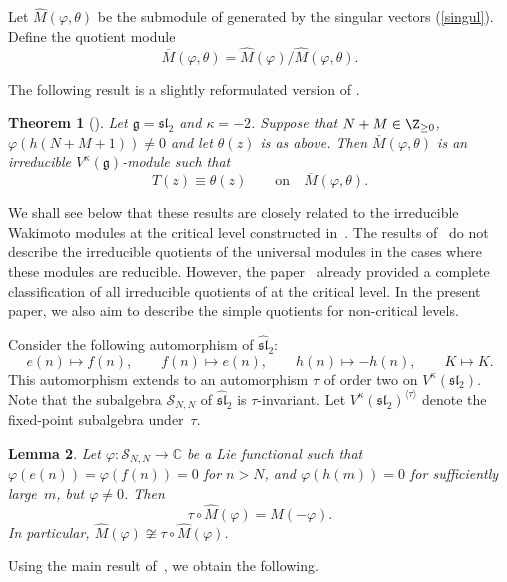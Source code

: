 \documentclass[pdftex]{sigma}
\numberwithin{equation}{section}
\newtheorem{Theorem}{Theorem}[section]
\newtheorem{Lemma}[Theorem]{Lemma}
\theoremstyle{definition}
\newcommand{\1}{\textbf{1}}
\begin{document}
Let $\widehat{M}(\varphi, \theta)$ be the submodule of  generated by the singular vectors (\ref{singul}). Define the quotient module
 \[ \overline M(\varphi, \theta) = \widehat M(\varphi)/ \widehat{M}(\varphi, \theta). \]

The following result is a slightly reformulated version of \cite[Theorem 1.2]{FGXZ}.

\begin{Theorem}[\cite{FGXZ}]\label{fgxz-critical}
Let $\mathfrak{g} = \mathfrak{sl}_{2}$ and $\kappa = -2$.
Suppose that $N+ M \in {\Z}_{\ge 0}$, $\varphi(h(N + M + 1)) \ne 0$ and let $\theta(z)$ is as above. Then
 $\overline{M}(\varphi, \theta)
$
is an irreducible $V^{\kappa}(\mathfrak{g})$-module such that
 \[ T(z) \equiv \theta(z) \qquad \mbox{on} \quad \overline{M}(\varphi, \theta).\]
\end{Theorem}

We shall see below that these results are closely related to the irreducible Wakimoto modules
at the critical level constructed in~\cite{A-07, A-14}.
The results of~\cite{FGXZ} do not describe the irreducible quotients of the universal modules
 in the cases where these modules are reducible.
However, the paper~\cite{A-14} already provided a complete classification of all irreducible quotients
of  at the critical level.
In the present paper, we also aim to describe the simple quotients for non-critical levels.

Consider the following automorphism of $\widehat{\mathfrak{sl}}_{2}$:
\[
 e(n) \mapsto f(n), \qquad
 f(n) \mapsto e(n), \qquad
 h(n) \mapsto -h(n), \qquad
 K \mapsto K.
\]
This automorphism extends to an automorphism $\tau$ of order two on $V^{\kappa}(\mathfrak{sl}_{2})$.
Note that the subalgebra $\mathcal{S}_{N,N}$ of $\widehat{\mathfrak{sl}}_{2}$ is $\tau$-invariant.
Let $V^{\kappa}(\mathfrak{sl}_{2})^{\langle \tau \rangle}$ denote the fixed-point subalgebra under~$\tau$.


\begin{Lemma}
Let $\varphi \colon \mathcal{S}_{N,N} \to \mathbb{C}$ be a Lie functional such that
$\varphi(e(n)) = \varphi(f(n)) = 0$ for $n > N$,
and $\varphi(h(m)) = 0$ for sufficiently large~$m$, but $\varphi \ne 0$.
Then
\[
 \tau \circ \widehat{M}(\varphi) = \widehat{M}(-\varphi).
\]
In particular, $\widehat{M}(\varphi) \not\cong \tau \circ \widehat{M}(\varphi)$.
\end{Lemma}

Using the main result of~\cite{ALPY}, we obtain the following.
\end{document}
